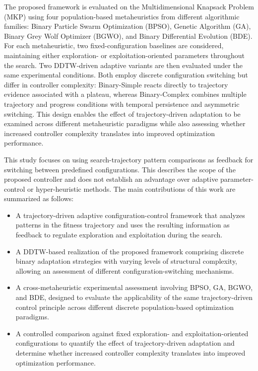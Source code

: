 \documentclass[mathematics,article,accept,moreauthors]{Definitions/mdpi}
\begin{document}
The proposed framework is evaluated on the Multidimensional Knapsack Problem
(MKP) using four population-based metaheuristics from different algorithmic
families: Binary Particle Swarm Optimization (BPSO), Genetic Algorithm (GA),
Binary Grey Wolf Optimizer (BGWO), and Binary Differential Evolution (BDE).
For each metaheuristic, two fixed-configuration baselines are considered,
maintaining either exploration- or exploitation-oriented parameters throughout
the search. Two DDTW-driven adaptive variants are then evaluated under the
same experimental conditions. Both employ discrete configuration switching
but differ in controller complexity: Binary-Simple reacts directly to
trajectory evidence associated with a plateau, whereas Binary-Complex
combines multiple trajectory and progress conditions with temporal
persistence and asymmetric switching. This design enables the effect of
trajectory-driven adaptation to be examined across different metaheuristic
paradigms while also assessing whether increased controller complexity
translates into improved optimization performance.

This study focuses on using search-trajectory pattern comparisons as feedback for switching between predefined configurations. This describes the scope of the proposed controller and does not establish an advantage over adaptive parameter-control or hyper-heuristic methods. The main contributions of this work are summarized as follows:

\begin{itemize}

\item A trajectory-driven adaptive configuration-control framework that analyzes patterns in the fitness trajectory and uses the resulting information as feedback to regulate exploration and exploitation during the search.

\item A DDTW-based realization of the proposed framework comprising discrete binary adaptation strategies with varying levels of structural complexity, allowing an assessment of different configuration-switching mechanisms.

\item A cross-metaheuristic experimental assessment involving BPSO, GA, BGWO, and BDE, designed to evaluate the applicability of the same trajectory-driven control principle across different discrete population-based optimization paradigms.

\item A controlled comparison against fixed exploration- and exploitation-oriented configurations to quantify the effect of trajectory-driven adaptation and determine whether increased controller complexity translates into improved optimization performance.
\end{itemize}
\end{document}

